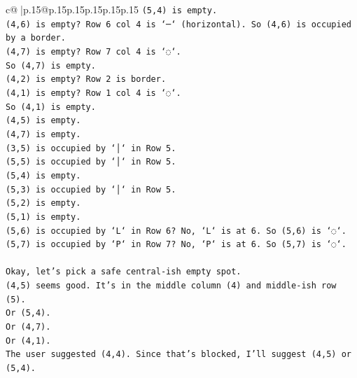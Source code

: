 \documentclass{article}
\begin{document}
{\begin{supertabular}{c@{$\;$}|p{.15\linewidth}@{}p{.15\linewidth}p{.15\linewidth}p{.15\linewidth}p{.15\linewidth}p{.15\linewidth}}
{{{\texttt{(5,4) is empty.} \\
\texttt{(4,6) is empty? Row 6 col 4 is `─` (horizontal). So (4,6) is occupied by a border.} \\
\texttt{(4,7) is empty? Row 7 col 4 is `◌`.} \\
\texttt{So (4,7) is empty.} \\
\texttt{(4,2) is empty? Row 2 is border.} \\
\texttt{(4,1) is empty? Row 1 col 4 is `◌`.} \\
\texttt{So (4,1) is empty.} \\
\texttt{(4,5) is empty.} \\
\texttt{(4,7) is empty.} \\
\texttt{(3,5) is occupied by `│` in Row 5.} \\
\texttt{(5,5) is occupied by `│` in Row 5.} \\
\texttt{(5,4) is empty.} \\
\texttt{(5,3) is occupied by `│` in Row 5.} \\
\texttt{(5,2) is empty.} \\
\texttt{(5,1) is empty.} \\
\texttt{(5,6) is occupied by `L` in Row 6? No, `L` is at 6. So (5,6) is `◌`.} \\
\texttt{(5,7) is occupied by `P` in Row 7? No, `P` is at 6. So (5,7) is `◌`.} \\
\\ 
\texttt{Okay, let's pick a safe central{-}ish empty spot.} \\
\texttt{(4,5) seems good. It's in the middle column (4) and middle{-}ish row (5).} \\
\texttt{Or (5,4).} \\
\texttt{Or (4,7).} \\
\texttt{Or (4,1).} \\
\texttt{The user suggested (4,4). Since that's blocked, I'll suggest (4,5) or (5,4).} \\
            }
        }
    }
     \\ \\


\end{supertabular}}
\end{document}

